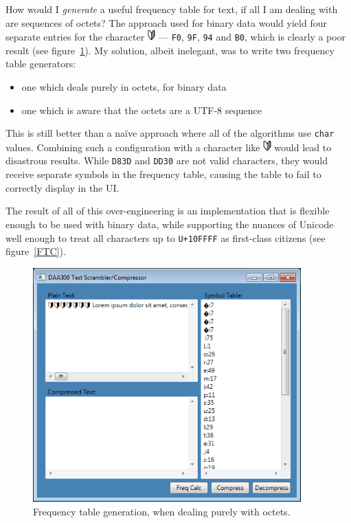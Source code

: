 \documentclass[a4paper,titlepage,12pt]{article}
\begin{document}
How would I \emph{generate} a useful frequency table for text, if all I am
dealing with are sequences of octets? The approach used for binary data would
yield four separate entries for the character \includegraphics[height=12pt]
{U+01F530.png} --- \texttt{F0}, \texttt{9F}, \texttt{94} and \texttt{B0}, which
is clearly a poor result (see figure~\ref{FTO}). My solution, albeit
inelegant, was to write two frequency table generators:

\begin{itemize}
	\item
		one which deals purely in octets, for binary data
	\item
		one which is aware that the octets are a UTF-8 sequence
\end{itemize}

This is still better than a naïve approach where all of the algorithms use
\texttt{char} values. Combining such a configuration with a character like
\includegraphics[height=12pt]{U+01F530.png} would lead to disastrous results.
While \texttt{D83D} and \texttt{DD30} are not valid characters, they would
receive separate symbols in the frequency table, causing the table to fail to
correctly display in the UI.

The result of all of this over-engineering is an implementation that is
flexible enough to be used with binary data, while supporting the nuances of
Unicode well enough to treat all characters up to \texttt{U+10FFFF} as
first-class citizens (see figure~\ref{FTC}).

\begin{center}
\begin{figure}[b]
	\begin{center}
		\includegraphics[height=9cm]{FTO.png}
	\end{center}
	\caption{
		Frequency table generation, when dealing purely with octets.
	}
	\label{FTO}
\end{figure}
\end{center}
\end{document}
